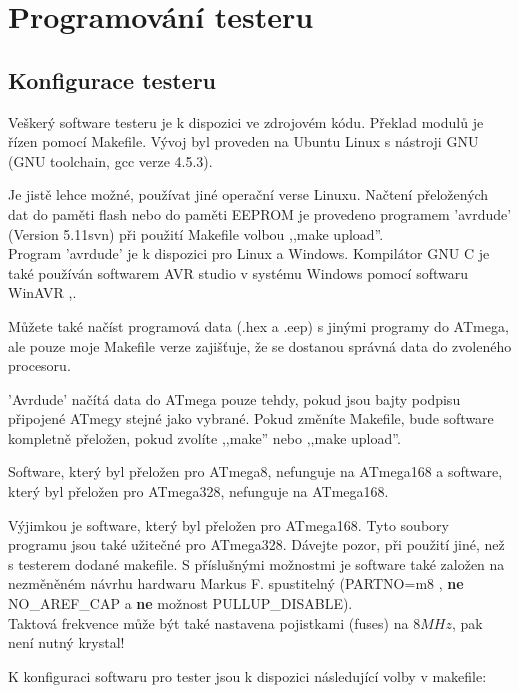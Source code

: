 \chapter{Programování testeru}
\label{sec:config}
\vspace{-0,7 cm}
\section{Konfigurace testeru}
\vspace*{-0,3 cm}
Veškerý software testeru je k dispozici ve zdrojovém kódu.
Překlad modulů je řízen pomocí Makefile. Vývoj byl proveden
na Ubuntu Linux s nástroji GNU (GNU toolchain, gcc verze 4.5.3).

Je jistě lehce možné, používat jiné operační verse Linuxu.
Načtení přeložených dat do paměti flash nebo do paměti EEPROM
je provedeno programem 'avrdude' \cite{avrdude} (Version 5.11svn) při použití Makefile volbou ,,make upload''.\\
 Program 'avrdude' je k dispozici pro Linux a Windows.
Kompilátor GNU C je také používán softwarem AVR studio v systému Windows pomocí softwaru WinAVR \cite{winavr1},\cite{winavr2}.

Můžete také načíst programová data (.hex a .eep) s jinými programy do ATmega,
ale pouze moje Makefile  verze zajišťuje, že se dostanou správná data do zvoleného procesoru.

'Avrdude' načítá data do ATmega pouze tehdy, pokud jsou bajty podpisu připojené ATmegy stejné jako vybrané.
Pokud změníte Makefile, bude software kompletně přeložen, pokud zvolíte ,,make'' nebo
,,make upload''.

Software, který byl přeložen pro ATmega8, nefunguje na ATmega168 a
software, který byl přeložen pro ATmega328, nefunguje na ATmega168.

Výjimkou je software, který byl přeložen pro ATmega168. Tyto soubory programu
jsou také užitečné pro ATmega328.
Dávejte pozor, při použití jiné, než s testerem dodané makefile.
S příslušnými možnostmi je software také založen na nezměněném návrhu hardwaru
Markus F. spustitelný (PARTNO=m8 , {\bf ne} NO\_AREF\_CAP a {\bf ne} možnost PULLUP\_DISABLE).\\
Taktová frekvence může být také nastavena pojistkami (fuses) na \(8MHz\), pak není nutný krystal!

K konfiguraci softwaru pro tester jsou k dispozici následující volby v makefile:

